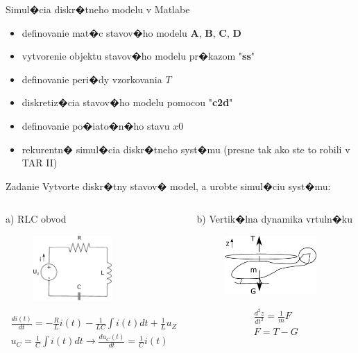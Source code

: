 \documentclass{beamer}
\renewcommand{\vec}[1]{\boldsymbol{#1}} %
\begin{document}
\begin{frame}{Simul�cia diskr�tneho modelu v Matlabe}
\begin{itemize}
\item definovanie mat�c stavov�ho modelu $\vec{A}$, $\vec{B}$, $\vec{C}$, $\vec{D}$
\item vytvorenie objektu stavov�ho modelu pr�kazom "\textbf{ss}"
\item definovanie peri�dy vzorkovania $T$
\item diskretiz�cia stavov�ho modelu pomocou "\textbf{c2d}"
\item definovanie po�iato�n�ho stavu $x0$
\item rekurentn� simul�cia diskr�tneho syst�mu (presne tak ako ste to robili v TAR II)
\end{itemize}
\end{frame}

\begin{frame}{Zadanie}
Vytvorte diskr�tny stavov� model, a urobte simul�ciu syst�mu:\\
\vspace{4mm}
\begin{columns}[T]
\begin{column}{0.48\textwidth}
\centering a) RLC obvod
\begin{figure}
\centering
\includegraphics[width = 3cm]{rlc_2.eps}
\end{figure}
\small
\begin{eqnarray*}
\frac{di(t)}{dt} = -\frac{R}{L}i(t) -\frac{1}{LC}\int{i(t)dt}+\frac{1}{L}u_{Z}\\
u_{C} = \frac{1}{C}\int{i(t)dt} \rightarrow \frac{du_{C}(t)}{dt} = \frac{1}{C}i(t)
\end{eqnarray*}
\normalsize
\end{column}

\begin{column}{0.48\textwidth}
\centering b) Vertik�lna dynamika vrtuln�ku
\begin{figure}
\centering
\includegraphics[width = 3.5cm]{hover.eps}
\end{figure}
\small
\begin{eqnarray*}
\frac{d^{2}z}{dt^2} = \frac{1}{m}F\\
F = T - G
\end{eqnarray*}
\normalsize
\end{column}

\end{columns}
\end{frame}
\end{document}
